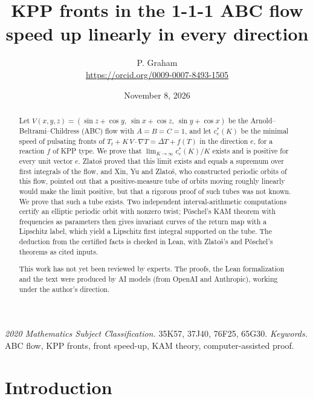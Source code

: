 \documentclass[11pt]{article}
\title{KPP fronts in the 1-1-1 ABC flow speed up linearly in every direction}
\author{P. Graham\\ \small\url{https://orcid.org/0009-0007-8493-1505}}
\date{November 8, 2026}
\theoremstyle{definition}
\theoremstyle{remark}
\begin{document}
\maketitle
\begin{abstract}
Let $V(x,y,z)=(\sin z+\cos y,\ \sin x+\cos z,\ \sin y+\cos x)$ be the
Arnold--Beltrami--Childress (ABC) flow with $A=B=C=1$, and let $c^*_e(K)$ be
the minimal speed of pulsating fronts of $T_t+K\,V\cdot\nabla T=\Delta T+f(T)$
in the direction $e$, for a reaction $f$ of KPP type. We prove that
$\lim_{K\to\infty}c^*_e(K)/K$ exists and is positive for every unit vector
$e$. Zlatoš proved that this limit exists and equals a supremum over first
integrals of the flow, and Xin, Yu and Zlatoš, who constructed periodic orbits
of this flow, pointed out that a positive-measure tube of orbits moving
roughly linearly would make the limit positive, but that a rigorous proof of
such tubes was not known. We prove that such a tube exists. Two independent
interval-arithmetic computations certify an elliptic periodic orbit with
nonzero twist; Pöschel's KAM theorem with frequencies as parameters then gives
invariant curves of the return map with a Lipschitz label, which yield a
Lipschitz first integral supported on the tube. The deduction from the
certified facts is checked in Lean, with Zlatoš's and Pöschel's theorems as
cited inputs.

This work has not yet been reviewed by experts.
The proofs, the Lean formalization and the text were produced by AI models (from OpenAI and Anthropic), working under the author's direction.
\end{abstract}
\medskip
\noindent\textit{2020 Mathematics Subject Classification.} 35K57, 37J40, 76F25, 65G30.
\textit{Keywords.} ABC flow, KPP fronts, front speed-up, KAM theory, computer-assisted proof.

\section{Introduction}
\end{document}
